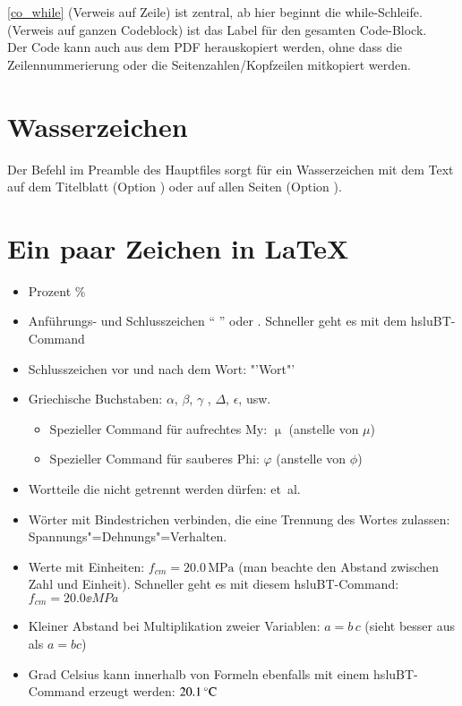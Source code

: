 \autoref{co_while} (Verweis auf Zeile) ist zentral, ab hier beginnt die while-Schleife.  (Verweis auf ganzen Codeblock) ist das Label für den gesamten Code-Block. \\%
%
Der Code kann auch aus dem PDF herauskopiert werden, ohne dass die Zeilennummerierung oder die Seitenzahlen/Kopfzeilen mitkopiert werden.%
%
%
%
%
%
%
\section{Wasserzeichen}%
%
Der Befehl  im Preamble des Hauptfiles sorgt für ein Wasserzeichen mit dem Text  auf dem Titelblatt (Option ) oder auf allen Seiten (Option ).
%
%
%
%
%
%
%
%
\section{Ein paar Zeichen in \LaTeX}%
%
\begin{itemize}%
\item Prozent \% %
\item Anführungs- und Schlusszeichen "` "' oder \glqq \grqq. Schneller geht es mit dem hsluBT-Command %
\item Schlusszeichen vor und nach dem Wort: "'Wort"' %
\item Griechische Buchstaben: $\alpha$, $\beta$, $\gamma$ , $\Delta$, $\epsilon$, usw.%
\begin{itemize}%
\item Spezieller Command für aufrechtes My: $\upmu$ (anstelle von $\mu$)%
\item Spezieller Command für sauberes Phi: $\varphi$ (anstelle von $\phi$)%
\end{itemize}%
\item Wortteile die nicht getrennt werden dürfen: \mbox{et al.} %
\item Wörter mit Bindestrichen verbinden, die eine Trennung des Wortes zulassen: Spannungs"=Dehnungs"=Verhalten. %
\item Werte mit Einheiten: $f_{cm} = 20.0 \, \textrm{MPa}$ (man beachte den Abstand zwischen Zahl und Einheit). Schneller geht es mit diesem hsluBT-Command: $f_{cm} = 20.0 \ee{MPa}$%
\item Kleiner Abstand bei Multiplikation zweier Variablen: $a = b\, c$ (sieht besser aus als $a = b c$) %
\item Grad Celsius kann innerhalb von Formeln ebenfalls mit einem hsluBT-Command erzeugt werden: $20.1 \,^{\circ}\mathrm{C}$%
%
\end{itemize}%
%
%
%
%
%
%
